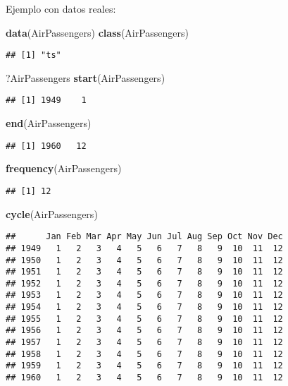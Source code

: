 \documentclass[]{article}
\newenvironment{Shaded}{\begin{snugshade}}{\end{snugshade}}
\newcommand{\KeywordTok}[1]{\textcolor[rgb]{0.13,0.29,0.53}{\textbf{{#1}}}}
\newcommand{\NormalTok}[1]{{#1}}
\numberwithin{equation}{section}
\begin{document}
Ejemplo con datos reales:

\begin{Shaded}
\begin{Highlighting}[]
\KeywordTok{data}\NormalTok{(AirPassengers)}
\KeywordTok{class}\NormalTok{(AirPassengers)}
\end{Highlighting}
\end{Shaded}

\begin{verbatim}
## [1] "ts"
\end{verbatim}

\begin{Shaded}
\begin{Highlighting}[]
\NormalTok{?AirPassengers}
\KeywordTok{start}\NormalTok{(AirPassengers)}
\end{Highlighting}
\end{Shaded}

\begin{verbatim}
## [1] 1949    1
\end{verbatim}

\begin{Shaded}
\begin{Highlighting}[]
\KeywordTok{end}\NormalTok{(AirPassengers)}
\end{Highlighting}
\end{Shaded}

\begin{verbatim}
## [1] 1960   12
\end{verbatim}

\begin{Shaded}
\begin{Highlighting}[]
\KeywordTok{frequency}\NormalTok{(AirPassengers)}
\end{Highlighting}
\end{Shaded}

\begin{verbatim}
## [1] 12
\end{verbatim}

\begin{Shaded}
\begin{Highlighting}[]
\KeywordTok{cycle}\NormalTok{(AirPassengers)}
\end{Highlighting}
\end{Shaded}

\begin{verbatim}
##      Jan Feb Mar Apr May Jun Jul Aug Sep Oct Nov Dec
## 1949   1   2   3   4   5   6   7   8   9  10  11  12
## 1950   1   2   3   4   5   6   7   8   9  10  11  12
## 1951   1   2   3   4   5   6   7   8   9  10  11  12
## 1952   1   2   3   4   5   6   7   8   9  10  11  12
## 1953   1   2   3   4   5   6   7   8   9  10  11  12
## 1954   1   2   3   4   5   6   7   8   9  10  11  12
## 1955   1   2   3   4   5   6   7   8   9  10  11  12
## 1956   1   2   3   4   5   6   7   8   9  10  11  12
## 1957   1   2   3   4   5   6   7   8   9  10  11  12
## 1958   1   2   3   4   5   6   7   8   9  10  11  12
## 1959   1   2   3   4   5   6   7   8   9  10  11  12
## 1960   1   2   3   4   5   6   7   8   9  10  11  12
\end{verbatim}
\end{document}
